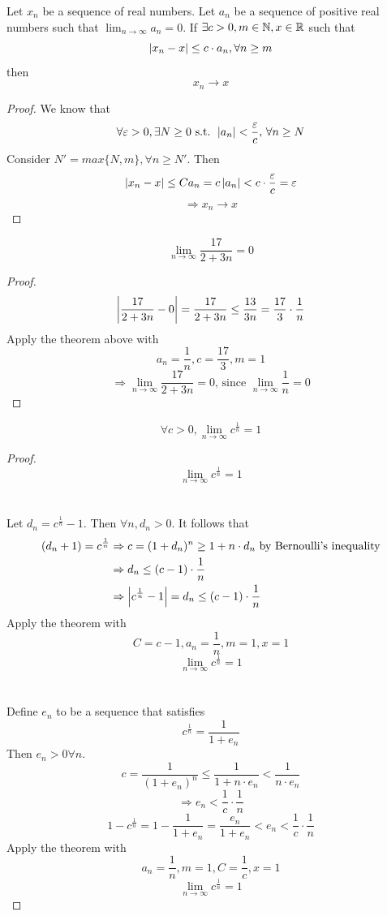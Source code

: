 \documentclass[a4paper,12pt]{article}
\begin{document}
\begin{theorem}
    Let \(x_n\) be a sequence of real numbers. 
    Let \(a_n\) be a sequence of positive real numbers such that \(\lim_{n\to \infty}a_n=0\).
    If \(\exists c>0, m\in \mathbb{N}, x\in \mathbb{R}\) such that \[\left\lvert x_n-x\right\rvert \le c\cdot a_n,\forall n\ge m\]
    then \[x_n\to x\]
\end{theorem}

\begin{proof}
    We know that
    \[\forall \varepsilon>0, \exists N\ge 0\text{ s.t. } \left\lvert a_n\right\rvert<\frac{\varepsilon}{c},\, \forall n\ge N\]
    Consider \(N'=max\{N,m\}, \forall n\ge N'\). Then 
    \[\left\lvert x_n-x\right\rvert\le Ca_n = c\left\lvert a_n\right\rvert<c\cdot\frac{\varepsilon}{c} = \varepsilon\]
    \[\Rightarrow x_n\rightarrow x\]
\end{proof}

\begin{proposition}
    \[\lim_{n\to\infty}\frac{17}{2+3n}=0\]
    \begin{proof}
        \[\left\lvert \frac{17}{2+3n}-0\right\rvert = \frac{17}{2+3n} \le \frac{13}{3n} = \frac{17}{3}\cdot\frac{1}{n}\]
        Apply the theorem above with \[a_n=\frac{1}{n},c = \frac{17}{3}, m=1\]
        \[\Rightarrow\lim_{n\to\infty}\frac{17}{2+3n}=0\text{, since }\lim_{n\to\infty}\frac{1}{n}=0\]
    \end{proof}
\end{proposition}

\newpage
\begin{proposition}
    \[\forall c>0, \lim_{n\to\infty}c^{\frac{1}{n}}=1\]
    \begin{proof}

         \[\lim_{n\to\infty}c^{\frac{1}{n}}=1\]
        \\\\
        Let \(d_n = c^{\frac{1}{n}}-1\). Then \(\forall n, d_n>0\). It follows that 
        \begin{align*}
            (d_n+1)=c^{\frac{1}{n}} & \Rightarrow c= (1+d_n)^n\ge 1+n\cdot d_n\text{ by Bernoulli's inequality}\\
            & \Rightarrow d_n\le (c-1)\cdot \frac{1}{n} \\
            & \Rightarrow \left\lvert c^{\frac{1}{n}}-1\right\rvert = d_n\le (c-1)\cdot\frac{1}{n}
        \end{align*}
        Apply the theorem with \[C = c-1,a_n = \frac{1}{n}, m=1,x=1\]
        \[\lim_{n\to\infty}c^{\frac{1}{n}}=1\]
        \\\\
        Define \(e_n\) to be a sequence that satisfies \[c^{\frac{1}{n}} = \frac{1}{1+e_n}\]
        Then \(e_n>0\forall n\).
        \[c = \frac{1}{(1+e_n)^n}\le\frac{1}{1+n\cdot e_n} < \frac{1}{n\cdot e_n}\]
        \[\Rightarrow e_n < \frac{1}{c}\cdot \frac{1}{n}\]
        \[1-c^{\frac{1}{n}}= 1-\frac{1}{1+e_n}= \frac{e_n}{1+e_n}<e_n<\frac{1}{c}\cdot \frac{1}{n}\]
        Apply the theorem with \[a_n = \frac{1}{n}, m=1,C=\frac{1}{c}, x=1\]
        \[\lim_{n\to\infty} c^\frac{1}{n}=1\]
    \end{proof}
\end{proposition}
\end{document}
